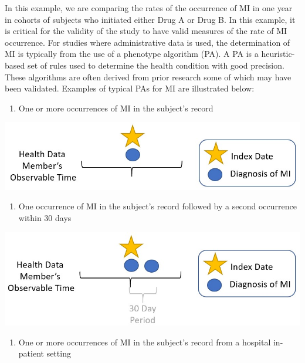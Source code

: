 \documentclass[11pt]{book}
\providecommand{\tightlist}{%
  \setlength{\itemsep}{0pt}\setlength{\parskip}{0pt}}
\theoremstyle{definition}
\theoremstyle{definition}
\theoremstyle{definition}
\theoremstyle{remark}
\begin{document}
In this example, we are comparing the rates of the occurrence of MI in one year in cohorts of subjects who initiated either Drug A or Drug B. In this example, it is critical for the validity of the study to have valid measures of the rate of MI occurrence. For studies where administrative data is used, the determination of MI is typically from the use of a phenotype algorithm (PA). A PA is a heuristic-based set of rules used to determine the health condition with good precision. These algorithms are often derived from prior research some of which may have been validated. Examples of typical PAs for MI are illustrated below: 

\begin{enumerate}
\def\labelenumi{\arabic{enumi})}
\tightlist
\item
  One or more occurrences of MI in the subject's record
\end{enumerate}

\begin{center}\includegraphics[width=0.75\linewidth]{images/ClinicalValidity/figure2} \end{center}

\begin{enumerate}
\def\labelenumi{\arabic{enumi})}
\setcounter{enumi}{1}
\tightlist
\item
  One occurrence of MI in the subject's record followed by a second occurrence within 30 days
\end{enumerate}

\begin{center}\includegraphics[width=0.75\linewidth]{images/ClinicalValidity/figure3} \end{center}

\begin{enumerate}
\def\labelenumi{\arabic{enumi})}
\setcounter{enumi}{2}
\tightlist
\item
  One or more occurrences of MI in the subject's record from a hospital in-patient setting
\end{enumerate}
\end{document}
